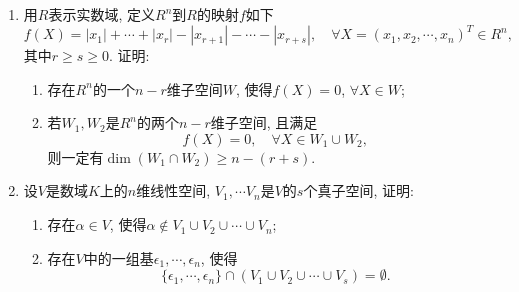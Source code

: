 \documentclass[12pt,a4paper,openany]{book}
\begin{document}
\begin{enumerate}
\item 用$R$表示实数域, 定义$R^n$到$R$的映射$f$如下
\[
f(X) = |x_1| + \cdots + |x_r| - |x_{r+1}| - \cdots - |x_{r+s}|, \quad \forall X = (x_1, x_2, \cdots, x_n)^T \in R^n,
\]
其中$r \ge s \ge 0$. 证明:
\begin{enumerate}
\item 存在$R^n$的一个$n - r$维子空间$W$, 使得$f(X) = 0$, $\forall X \in W$;
\item 若$W_1, W_2$是$R^n$的两个$n - r$维子空间, 且满足
\[
f(X) = 0, \quad \forall X \in W_1 \cup W_2,
\]
则一定有$\dim(W_1 \cap W_2) \ge n - (r + s)$.
\end{enumerate}

\item 设$V$是数域$K$上的$n$维线性空间, $V_1, \cdots V_n$是$V$的$s$个真子空间, 证明:
\begin{enumerate}
\item 存在$\alpha \in V$, 使得$\alpha \notin V_1 \cup V_2 \cup \cdots \cup V_n$;
\item 存在$V$中的一组基$\epsilon_1, \cdots, \epsilon_n$, 使得
\[
\{ \epsilon_1, \cdots, \epsilon_n \} \cap (V_1 \cup V_2 \cup \cdots \cup V_s) = \emptyset.
\]
\end{enumerate}

\end{enumerate}
\end{document}
